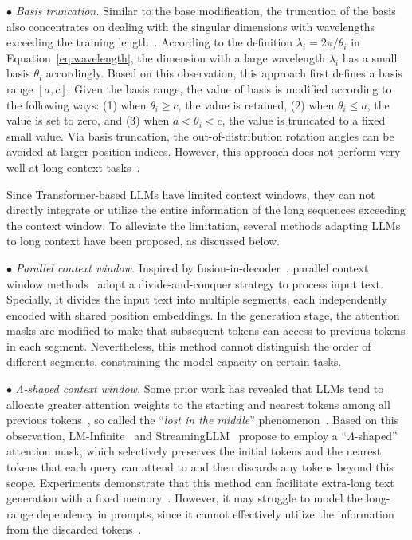 {$\bullet$ \emph{Basis truncation.} Similar to the base modification, the truncation of the basis also concentrates on dealing with the singular dimensions with wavelengths exceeding the training length~\cite{Pal-arxiv-2023-giraffe}. According to the definition $\lambda_i=2\pi/\theta_i$ in Equation~\ref{eq:wavelength}, the dimension with a large wavelength $\lambda_i$ has a small basis $\theta_i$ accordingly. Based on this observation, this approach first defines a basis range $[a, c]$. 
{
Given the basis range, the value of basis is modified according to the following ways: (1) when $\theta_i\geq  c$, the value is retained, (2) when $\theta_i \leq a$, the value is set to zero, and (3) when $a < \theta_i < c$, the value is truncated to a fixed small value.} 
{Via basis truncation, the out-of-distribution rotation angles can be avoided at larger position indices. However, this approach does not perform very well at long context tasks~\cite{Pal-arxiv-2023-giraffe}.}


{Since Transformer-based LLMs have limited context windows, they can not directly integrate or utilize the entire information of the  long sequences exceeding the context  window. To alleviate the limitation, several methods adapting LLMs to long context have been proposed, as discussed below.
}


{
$\bullet$ \emph{Parallel context window.} Inspired by fusion-in-decoder~\cite{Izacard-EACL-2021-Leveraging}, parallel context window methods~\cite{Partner-ACL-2023-Parallel,Hao-2022-arxiv-Structured} adopt a divide-and-conquer strategy to process input text. Specially, it divides the input text into multiple segments, each independently encoded with shared position embeddings. In the generation stage, the attention masks are modified to make that subsequent tokens can access to previous tokens in each segment.
Nevertheless, this method cannot distinguish the order of different segments, constraining the model capacity on certain tasks.}

{
$\bullet$ \emph{$\Lambda$-shaped context window.} 
Some prior work has revealed that LLMs tend to allocate greater attention weights to the starting and nearest tokens among all previous tokens~\cite{Beltagy-arxiv-2020-longformer,Xiao-arxiv-2023-Efficient}, so called the ``\emph{lost in the middle}'' phenomenon~\cite{Liu-arxiv-2023-Lost}.}
Based on this observation, 
LM-Infinite~\cite{Han-arxiv-2023-LMinfinite} and StreamingLLM~\cite{Xiao-arxiv-2023-Efficient} propose to employ a ``$\Lambda$-shaped'' attention mask, which selectively preserves the initial tokens and the nearest tokens that each query can attend to and then discards any tokens beyond this scope.  %
{Experiments demonstrate that this method can facilitate extra-long text generation with a fixed memory~\cite{Xiao-arxiv-2023-Efficient}.}  However, it may struggle to model the long-range dependency in prompts, {since it cannot effectively utilize the information from the discarded tokens~\cite{Xiao-arxiv-2023-Efficient}.}

}
